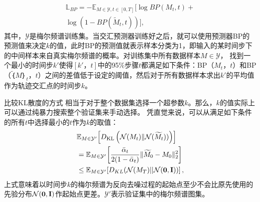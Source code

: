 \begin{align*}
    \mathbb{L}_{BP} = - \mathbb{E}_{M\in\mathcal{Y}, t \in [0, T]} [\log BP(M_t, t) + \\
    \log (1-BP(\widetilde{M}_t, t))],
\end{align*}
其中，$\mathcal{Y}$是梅尔频谱训练集。当交汇预测器训练好之后，就可以使用预测器BP的预测值来决定$k$的值，此时BP的预测值就表示样本分类为1，即输入的某时间步下的中间样本来自真实梅尔频谱的概率。对训练集中所有数据样本$ M \in \mathcal{Y}$，
找到一个最小的时间步$k'$使得$[k'，t]$中的95\%步骤$t$都满足如下条件：BP（$M_t$，$t$）和BP（$\widetilde｛M｝_t$，$t$）之间的差值低于设定的阈值，然后对于所有数据样本求出$k'$的平均值作为轨迹交汇点的时间步$k$。

比较KL散度的方式
相当于对于整个数据集选择一个超参数$k$。那么，$k$的值实际上可以通过纯暴力搜索整个验证集来手动选择。
凭直觉来说，可以从满足如下条件的所有$t$中选择最小的$t$作为$k$的取值：
\begin{align}
    &\mathbb{E}_{M\in \mathcal{Y'}}\!\left[D_{\mathrm{KL}}\left(\mathcal{N}(M_t)  \| \mathcal{N}(\widetilde{M}_t))\right)\right] \\
    &=  \mathbb{E}_{M\in \mathcal{Y'}}\!\left[\frac{\bar\alpha_t}{2(1-\bar\alpha_t)} \|\widetilde{M}_0-M_0 \| _2^2\right]\\ &\leq \mathbb{E}_{M\in \mathcal{Y'}}\!\left[D_{KL}(\mathcal{N}(M_T) || \mathcal{N}(\mathbf{0}, \mathbf{I}))\right],
\end{align}
上式意味着以时间步$k$的梅尔频谱为反向去噪过程的起始点至少不会比原先使用的先验分布$\mathcal{N}(\mathbf{0}, \mathbf{I})$作起始点更差。$\mathcal{Y'}$表示验证集中的梅尔频谱图集。
